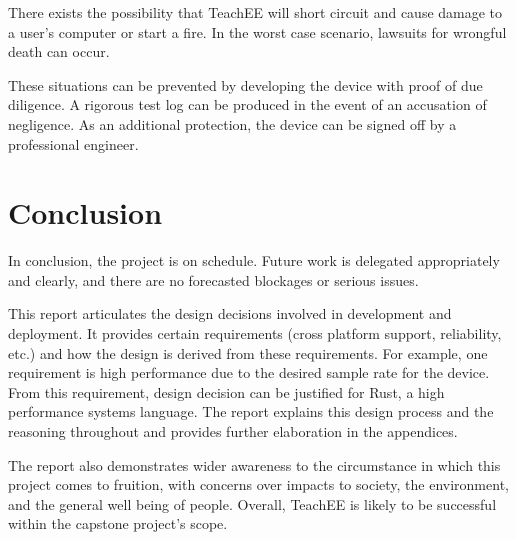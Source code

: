 \documentclass[letterpaper,12pt]{article}
\begin{document}
There exists the possibility that TeachEE will short circuit and cause
damage to a user's computer or start a fire. In the worst case
scenario, lawsuits for wrongful death can occur.

These situations can be prevented by developing the device with proof of due
diligence. A rigorous test log can be produced in the event of an accusation of
negligence. As an additional protection, the device can be signed off by a
professional engineer.

\section{Conclusion}

In conclusion, the project is on schedule. Future
work is delegated appropriately and clearly, and there are no forecasted
blockages or serious issues.

This report articulates the design decisions involved in development and
deployment. It provides certain requirements (cross platform support,
reliability, etc.) and how the design is derived from these requirements. For
example, one requirement is high performance due to the desired sample rate for
the device. From this requirement, design decision can be justified for Rust, a high performance systems
language. The report explains this design process and the reasoning throughout
and provides further elaboration in the appendices.

The report also demonstrates wider awareness to the circumstance in which this
project comes to fruition, with concerns over impacts to society, the
environment, and the general well being of people. Overall, TeachEE is
likely to be successful within the capstone project's scope.

\newpage


\newpage
\pagestyle{empty}
\end{document}
